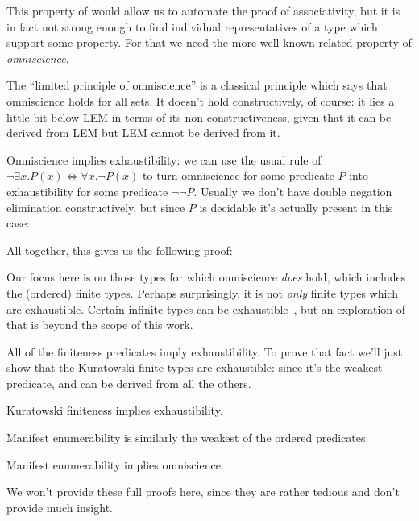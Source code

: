 This property of  would allow us to automate the proof of
associativity, but it is in fact not strong enough to find individual
representatives of a type which support some property.
For that we need the more well-known related property of
\emph{omniscience}.
\begin{agdalisting*}
\end{agdalisting*}
The ``limited principle of omniscience''
\citep{bishopFoundationsConstructiveAnalysis1967} is a classical principle which
says that omniscience holds for all sets.
It doesn't hold constructively, of course: it lies a little bit below LEM in
terms of its non-constructiveness, given that it can be derived from LEM but LEM
cannot be derived from it.

Omniscience implies exhaustibility: we can use the usual rule of \(\neg \exists x. P(x) \iff \forall x. \neg P(x) \)
to turn omniscience for some predicate \(P\) into exhaustibility for some
predicate \(\neg \neg P\).
Usually we don't have double negation elimination constructively, but since
\(P\) is decidable it's actually present in this case:
\begin{agdalisting*}
\end{agdalisting*}
All together, this gives us the following proof:
\begin{agdalisting*}
\end{agdalisting*}

Our focus here is on those types for which omniscience \emph{does} hold,
which includes the (ordered) finite types.
Perhaps surprisingly, it is not \emph{only} finite types which are exhaustible.
Certain infinite types can be
exhaustible~\citep{escardoInfiniteSetsThat2007}, but an exploration of that is
beyond the scope of this work.

All of the finiteness predicates imply exhaustibility.
To prove that fact we'll just show that the Kuratowski finite types are
exhaustible: since it's the weakest predicate, and can be derived from all the
others.
\begin{lemma}
  Kuratowski finiteness implies exhaustibility.
\end{lemma}
Manifest enumerability is similarly the weakest of the ordered predicates:
\begin{lemma}
  Manifest enumerability implies omniscience.
\end{lemma}
We won't provide these full proofs here, since they are rather tedious and don't
provide much insight.

